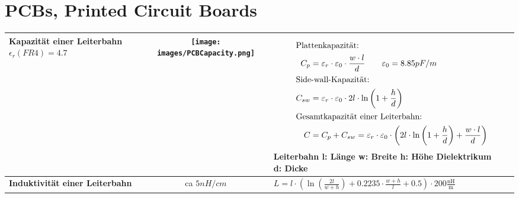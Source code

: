 \section{PCBs, Printed Circuit Boards}

\begin{longtable}{|>{\bfseries}p{3cm}|c|p{11.2cm}|}
    \hline
    Kapazität \newline einer Leiterbahn\newline $\epsilon_r(FR4) = 4.7$
    & \texttt{[image: images/PCBCapacity.png]}
    & {\vspace{-1.8\topsep}
        \begin{align*}
            \intertext{Plattenkapazität:}
            C_p &= \varepsilon_{r}\cdot \varepsilon_{0}\cdot \frac{w\cdot l}{d} \qquad \varepsilon_{0}= 8.85 pF/m\\
            \intertext{Side-wall-Kapazität:}
            C_{sw} &= \varepsilon_{r}\cdot \varepsilon_{0}\cdot 2l \cdot \ln\left( 1 + \frac{h}{d}\right) \\
            \intertext{Gesamtkapazität einer Leiterbahn:}
            C &= C_p + C_{sw} = \varepsilon_{r}\cdot \varepsilon_{0}\cdot \left( 2l \cdot \ln\left( 1 + \frac{h}{d}\right) + \frac{w\cdot l}{d}\right) 
        \end{align*}
        \newline
        Leiterbahn \qquad l: Länge \qquad w: Breite \qquad h: Höhe\newline
        Dielektrikum $\;\;$ d: Dicke
    }
    \\ \hline
    Induktivität \newline einer Leiterbahn
    & ca $5nH / cm$
    & {%
       $L = l \cdot\left( \ln\left( \frac{2l}{w + h}\right)  + 0.2235 \cdot \frac{w + h}{l} + 0.5\right)  \cdot 200\frac{\mathrm{nH}}{\mathrm{m}}$
       \newline 
      }
    \\ \hline
\end{longtable}